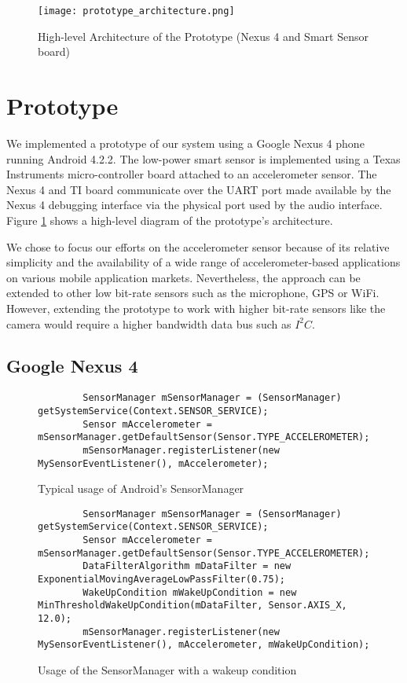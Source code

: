 
\begin{figure}[t]
	\texttt{[image: prototype\_architecture.png]}
	\caption{High-level Architecture of the Prototype (Nexus 4 and Smart Sensor board)}
    \label{fig:prototypeArchitecture}
\end{figure}

\section{Prototype}
\label{sec:prototype}

We implemented a prototype of our system using a Google Nexus 4 phone running Android 4.2.2. The low-power smart sensor is implemented using a Texas Instruments micro-controller board attached to an accelerometer sensor. The Nexus 4 and TI board communicate over the UART port made available by the Nexus 4 debugging interface via the physical port used by the audio interface. Figure \ref{fig:prototypeArchitecture} shows a high-level diagram of the prototype's architecture.

We chose to focus our efforts on the accelerometer sensor because of its relative simplicity and the availability of a wide range of accelerometer-based applications on various mobile application markets. Nevertheless, the approach can be extended to other low bit-rate sensors such as the microphone, GPS or WiFi. However, extending the prototype to work with higher bit-rate sensors like the camera would require a higher bandwidth data bus such as $I^2C$. 


\subsection{Google Nexus 4}
\label{subsec:nexus}

\begin{figure*}[t]
	\begin{verbatim}
		SensorManager mSensorManager = (SensorManager) getSystemService(Context.SENSOR_SERVICE);
		Sensor mAccelerometer = mSensorManager.getDefaultSensor(Sensor.TYPE_ACCELEROMETER);
		mSensorManager.registerListener(new MySensorEventListener(), mAccelerometer);
	\end{verbatim}
	\caption{Typical usage of Android's SensorManager}
    \label{fig:androidSensorCodeNormal}
\end{figure*}

\begin{figure*}[t]
	\begin{verbatim}
		SensorManager mSensorManager = (SensorManager) getSystemService(Context.SENSOR_SERVICE);
		Sensor mAccelerometer = mSensorManager.getDefaultSensor(Sensor.TYPE_ACCELEROMETER);
		DataFilterAlgorithm mDataFilter = new ExponentialMovingAverageLowPassFilter(0.75);
		WakeUpCondition mWakeUpCondition = new MinThresholdWakeUpCondition(mDataFilter, Sensor.AXIS_X, 12.0);
		mSensorManager.registerListener(new MySensorEventListener(), mAccelerometer, mWakeUpCondition);
	\end{verbatim}
	\caption{Usage of the SensorManager with a wakeup condition}
    \label{fig:androidSensorCodeModified}
\end{figure*}

